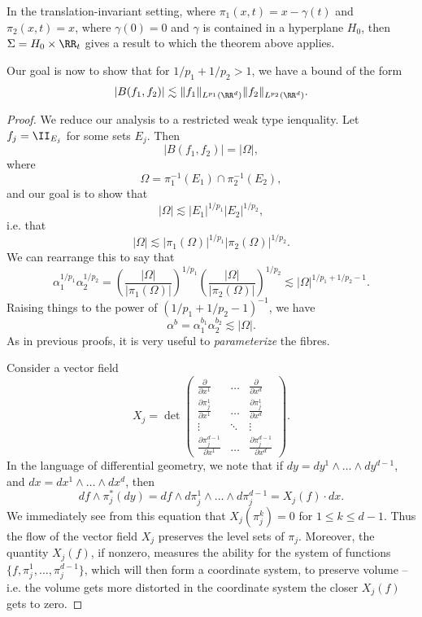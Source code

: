 In the translation-invariant setting, where $\pi_1(x,t) = x - \gamma(t)$ and $\pi_2(x,t) = x$, where $\gamma(0) = 0$ and $\gamma$ is contained in a hyperplane $H_0$, then $\Sigma = H_0 \times \RR_t$ gives a result to which the theorem above applies.


\begin{theorem}
    Our goal is now to show that for $1/p_1 + 1/p_2 > 1$, we have a bound of the form
    \[ |B(f_1,f_2)| \lesssim \| f_1 \|_{L^{p_1}(\RR^d)} \| f_2 \|_{L^{p_2}(\RR^d)}. \]
\end{theorem}
\begin{proof}
    We reduce our analysis to a restricted weak type ienquality. Let $f_j = \II_{E_j}$ for some sets $E_j$. Then
    \[ |B(f_1,f_2)| = |\Omega|, \]
    where
    \[ \Omega = \pi_1^{-1}(E_1) \cap \pi_2^{-1}(E_2), \]
    and our goal is to show that
    \[ |\Omega| \lesssim |E_1|^{1/p_1} |E_2|^{1/p_2}, \]
    i.e. that
    \[ |\Omega| \lesssim |\pi_1(\Omega)|^{1/p_1} |\pi_2(\Omega)|^{1/p_2}. \]
    We can rearrange this to say that
    \[ \alpha_1^{1/p_1} \alpha_2^{1/p_2} = \left( \frac{|\Omega|}{|\pi_1(\Omega)|} \right)^{1/p_1} \left( \frac{|\Omega|}{|\pi_2(\Omega)|} \right)^{1/p_2} \lesssim |\Omega|^{1/p_1 + 1/p_2 - 1}. \]
    Raising things to the power of $(1/p_1 + 1/p_2 - 1)^{-1}$, we have
    \[ \alpha^b = \alpha_1^{b_1} \alpha_2^{b_2} \lesssim |\Omega|. \]
    As in previous proofs, it is very useful to \emph{parameterize} the fibres.

    Consider a vector field
    \[ X_j = \det \begin{pmatrix} \frac{\partial}{\partial x^1} & \dots & \frac{\partial}{\partial x^d} \\ 

    \frac{\partial \pi_j^1}{\partial x^1} & \dots & \frac{\partial \pi_j^1}{\partial x^d} \\

    \vdots & \ddots & \vdots \\

    \frac{\partial \pi_j^{d-1}}{\partial x^1} & \dots & \frac{\partial \pi_j^{d-1}}{\partial x^d}

     \end{pmatrix}. \]
     In the language of differential geometry, we note that if $dy = dy^1 \wedge \dots \wedge dy^{d-1}$, and $dx = dx^1 \wedge \dots \wedge dx^d$, then
     \[ df \wedge \pi_j^*(dy) = df \wedge d\pi_j^1 \wedge \dots \wedge d\pi_j^{d-1} = X_j(f) \cdot dx. \]
     We immediately see from this equation that $X_j(\pi_j^k) = 0$ for $1 \leq k \leq d-1$. Thus the flow of the vector field $X_j$ preserves the level sets of $\pi_j$. Moreover, the quantity $X_j(f)$, if nonzero, measures the ability for the system of functions $\{ f, \pi_j^1, \dots, \pi_j^{d-1} \}$, which will then form a coordinate system, to preserve volume -- i.e. the volume gets more distorted in the coordinate system the closer $X_j(f)$ gets to zero.


\end{proof}
